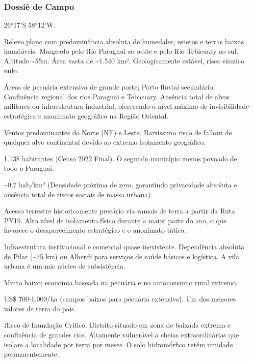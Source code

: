 \subsubsection{Dossiê de Campo}
\begin{description}[style=nextline,leftmargin=0.5cm,font=\bfseries]
\item[Coordenadas]  26°17'S 58°12'W.
\item[Topografia]  Relevo plano com predominância absoluta de humedales, esteros e terras baixas inundáveis. Margeado pelo Rio Paraguai ao oeste e pelo Rio Tebicuary ao sul. Altitude \textasciitilde 55m. Área vasta de \textasciitilde 1.540 km². Geologicamente estável, risco sísmico nulo.
\item[Alvos Estratégicos]  Áreas de pecuária extensiva de grande porte; Porto fluvial secundário; Confluência regional dos rios Paraguai e Tebicuary. Ausência total de alvos militares ou infraestrutura industrial, oferecendo o nível máximo de invisibilidade estratégica e anonimato geográfico na Região Oriental.
\item[Fallout]  Ventos predominantes do Norte (NE) e Leste. Baixíssimo risco de fallout de qualquer alvo continental devido ao extremo isolamento geográfico.
\item[População]  1.138 habitantes (Censo 2022 Final). O segundo município menos povoado de todo o Paraguai.
\item[Densidade]  \textasciitilde 0,7 hab/\allowbreak km² (Densidade próxima de zero, garantindo privacidade absoluta e ausência total de riscos sociais de massa urbana).
\item[Vias de Acesso]  Acesso terrestre historicamente precário via ramais de terra a partir da Ruta PY19. Alto nível de isolamento físico durante a maior parte do ano, o que favorece o desaparecimento estratégico e o anonimato tático.
\item[Serviços]  Infraestrutura institucional e comercial quase inexistente. Dependência absoluta de Pilar (\textasciitilde 75 km) ou Alberdi para serviços de saúde básicos e logística. A vila urbana é um mic núcleo de subsistência.
\item[Custo de Vida]  Muito baixo; economia baseada na pecuária e no autoconsumo rural extremo.
\item[Preço da Terra]  US\$ 700-1.000/\allowbreak ha (campos baixos para pecuária extensiva). Um dos menores valores de terra do país.
\item[Hidrologia]  Risco de Inundação Crítico. Distrito situado em zona de baixada extrema e confluência de grandes rios. Altamente vulnerável a cheias extraordinárias que isolam a localidade por terra por meses. O solo hidromórfico retém umidade permanentemente.

\end{description}
